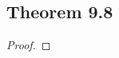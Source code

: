 \documentclass[../../main.tex]{subfiles}
\begin{document}
\subsection{Theorem 9.8}
\begin{wts}

\end{wts}
\begin{proof}

\end{proof}
\end{document}
